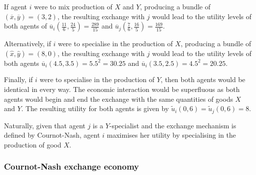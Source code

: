 \begin{example}
If agent $i$ were to mix production of $X$ and $Y$, producing a bundle of $(\overline{x}, \overline{y}) = (3,2)$, the resulting exchange with $j$ would lead to the utility levels of both agents of $\overline{u}_{i} \left( \frac{11}{6}, \frac{24}{5} \right) = \frac{289}{15}$ and $\overline{u}_{j} \left( \frac{7}{6}, \frac{16}{5} \right) = \frac{169}{15}$.

Alternatively, if $i$ were to specialise in the production of $X$, producing a bundle of $(\hat{x}, \hat{y}) = (8,0)$, the resulting exchange with $j$ would lead to the utility levels of both agents $\overline{u}_{i} \left( 4.5, 3.5 \right) = 5.5^2 = 30.25$ and $\overline{u}_{i} \left( 3.5, 2.5 \right) = 4.5^2 = 20.25$.

Finally, if $i$ were to specialise in the production of $Y$, then both agents would be identical in every way. The economic interaction would be superfluous as both agents would begin and end the exchange with the same quantities of goods $X$ and $Y$. The resulting utility for both agents is given by $\tilde{u}_{i} \left( 0, 6 \right) = \tilde{u}_{j} \left( 0, 6 \right) = 8$.

Naturally, given that agent $j$ is a $Y$-specialist and the exchange mechanism is defined by Cournot-Nash, agent $i$ maximises her utility by specialising in the production of good $X$.
\end{example}

\subsubsection{Cournot-Nash exchange economy}

